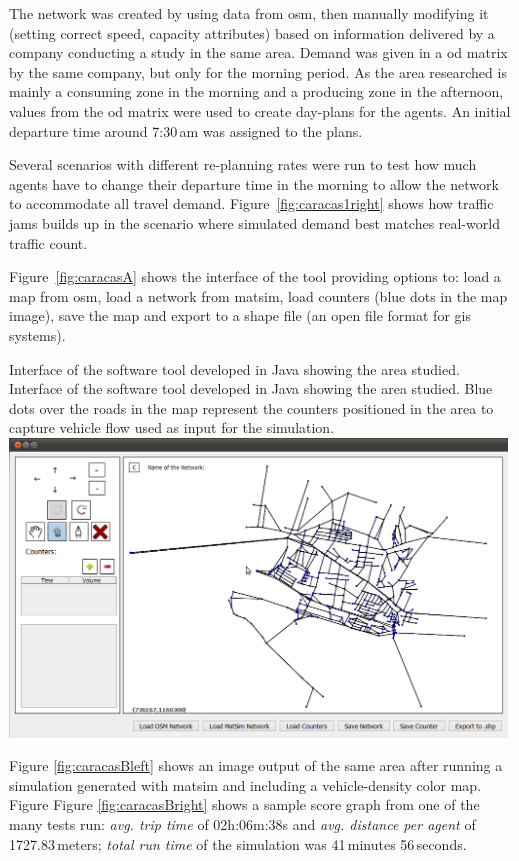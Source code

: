 The network was created by using data from \gls{osm}, then manually modifying it (\ie setting correct speed, capacity attributes) based on information delivered by a company conducting a study in the same area. Demand was given in a \gls{od} matrix by the same company, but only for the morning period. As the area researched is mainly a consuming zone in the morning and a producing zone in the afternoon, values from the \gls{od} matrix were used to create day-plans for the agents. An initial departure time around 7:30\,am was assigned to the plans.

Several scenarios with different re-planning rates were run to test how much agents have to change their departure time in the morning to allow the network to accommodate all travel demand. Figure~\ref{fig:caracas1right} shows how traffic jams builds up in the scenario where simulated demand best matches real-world traffic count.

Figure~\ref{fig:caracasA} shows the interface of the tool providing options to: load a map from \gls{osm}, load a network from \gls{matsim}, load counters (blue dots in the map image), save the map and export to a shape file (an open file format for \gls{gis} systems).

\createfigure%
{Interface of the software tool developed in Java showing the area studied.}%
{Interface of the software tool developed in Java showing the area studied. Blue dots over the roads in the map represent the counters positioned in the area to capture vehicle flow used as input for the simulation.}%
{\label{fig:caracasA}}%
{\includegraphics[width=0.99\textwidth, angle=0]{./scenarios/figures/caracasA.png}}%
{}

Figure \ref{fig:caracasBleft} shows an image output of the same area after running a simulation generated with \gls{matsim} and including a vehicle-density color map. Figure Figure \ref{fig:caracasBright} shows a sample score graph from one of the many tests run: \textit{avg. trip time} of 02h:06m:38s and \emph{avg. distance per agent} of 1727.83\,meters; \textit{total run time} of the simulation was 41\,minutes 56\,seconds.

